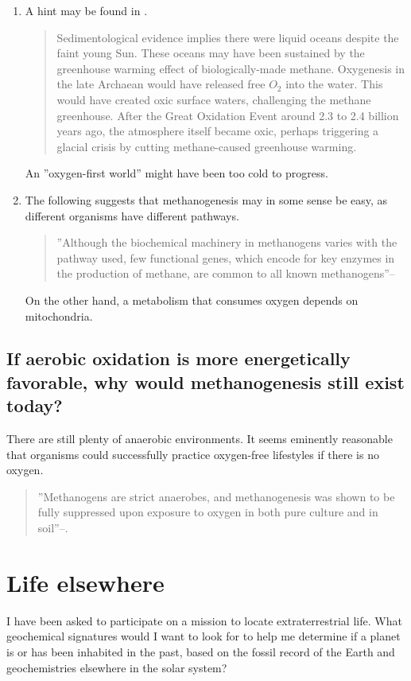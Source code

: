 \documentclass[]{article}
\begin{document}
\begin{enumerate}
	\item A hint may be found in \cite{nisbet2011evolution}.\begin{quote}
		Sedimentological evidence implies there were liquid oceans despite the faint young Sun. These oceans may have been sustained by the greenhouse warming effect of biologically-made methane. Oxygenesis in the late Archaean would have released free $O_2$ into the water. This would have created oxic surface waters, challenging the methane greenhouse. After the Great Oxidation Event around 2.3 to 2.4 billion years ago, the atmosphere itself became oxic, perhaps triggering a glacial crisis by cutting methane-caused greenhouse warming.
	\end{quote}
	An ''oxygen-first world'' might have been too cold to progress.
	\item The following suggests that methanogenesis may in some sense be easy, as different organisms have different pathways.
	\begin{quote}
		''Although the biochemical machinery in methanogens varies with the pathway used, few functional genes, which encode for key enzymes in the production of methane, are common to all known methanogens''--\cite{angel2012methanogenic}
	\end{quote}
	On the other hand, a metabolism that consumes oxygen depends on mitochondria.
\end{enumerate}

\subsection[Why would methanogenesis still exist today?]{
	If aerobic oxidation is more energetically favorable, why would methanogenesis still exist today?
}
There are still plenty of anaerobic environments. It seems eminently reasonable that organisms could successfully practice oxygen-free lifestyles if there is no oxygen.
\begin{quote}
	''Methanogens are strict anaerobes, and methanogenesis was shown to be fully suppressed upon exposure to oxygen in both pure culture and in soil''--\cite{angel2012methanogenic}.
\end{quote}

\section{Life elsewhere}

I have been asked to participate on a mission to locate extraterrestrial life. What geochemical signatures would I want to look for to help me determine if a planet is or has been inhabited in the past, based on the fossil record of the Earth and geochemistries elsewhere in the solar system?
\end{document}
